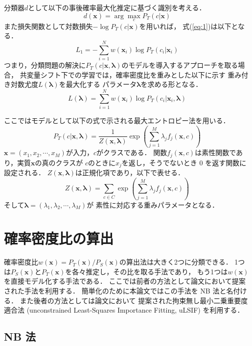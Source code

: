 \documentclass[japanese]{jnlp_1.4}
\begin{document}
分類器$d$として以下の事後確率最大化推定に基づく識別を考える．
\[
d({\bm x}) = \arg \max_{c} P_T(c|{\bm x})
\]
また損失関数として対数損失$- \log P_T(c|{\bm x})$を用いれば，
\mbox{式(\ref{eq:1})}は以下となる．
\[
L_1 = - \sum_{i=1}^N w({\bm x_i}) \log P_T(c_i|{\bm x_i}) 
\]
つまり，分類問題の解決に$P_T(c|{\bm x},{\bm \lambda})$のモデルを導入するアプローチを取る場合，
共変量シフト下での学習では，確率密度比を重みとした以下に示す
重み付き対数尤度$L({\bm \lambda})$を最大化する
パラメータ${\bm \lambda}$を求める形となる．
\begin{equation}
     \label{eq:2}
    L({\bm \lambda}) = \sum_{i=1}^N w({\bm x_i}) \log P_T(c_i|{\bm x_i},{\bm \lambda})        
\end{equation}


ここではモデルとして以下の式で示される最大エントロピー法を用いる．
\begin{equation}
     \label{eq:3}
P_T(c|{\bm x},{\bm \lambda}) = \frac{1}{Z({\bm x},{\bm \lambda})} \exp \left(
\sum_{j=1}^M \lambda_j f_j({\bm x},c)
\right)
\end{equation}
${\bm x} = (x_1,x_2,\cdots,x_M)$が入力，$c$がクラスである．
関数$f_j({\bm x},c)$は素性関数であり，実質${\bm x}$の真のクラスが
$c$のときに$x_j$を返し，そうでないとき 0 を返す関数に設定される．
$Z({\bm x},{\bm \lambda})$は正規化項であり，以下で表せる．
\begin{equation}
     \label{eq:4}
  Z({\bm x},{\bm \lambda}) = \sum_{c \in C} \exp \left(
\sum_{j=1}^M \lambda_j f_j({\bm x},c) 
\right)
\end{equation}
\noindent
そして${\bm \lambda} = (\lambda_1,\lambda_2,\cdots,\lambda_M)$が
素性に対応する重みパラメータとなる．


\section{確率密度比の算出}

確率密度比$w({\bm x}) =  P_T({\bm x})/P_S({\bm x})$の算出法は大きく2つに分類できる．
1つは$P_S({\bm x})$と$P_T({\bm x})$を各々推定し，その比を取る手法であり，
もう1つは$w({\bm x})$を直接モデル化する手法である．
ここでは前者の方法として論文\cite{shinnou-gengo-14}において提案された手法を利用する．
簡単化のために本論文ではこの手法を NB 法と名付ける．
また後者の方法としては論文\cite{kanamori2009least}において
提案された拘束無し最小二乗重要度適合法 (unconstrained Least-Squares Importance Fitting, uLSIF)
を利用する．


\subsection{NB 法}
\end{document}
